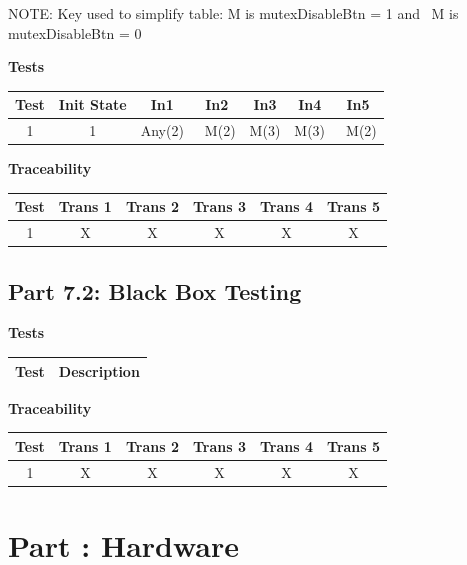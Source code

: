 \documentclass{article}
\newcounter{partNum}
\newcommand{\partNum}{%
        \stepcounter{partNum}%
        \thepartNum}
\newcommand{\sectPart}[1]{\section*{Part \partNum: #1}}
\begin{document}
NOTE: Key used to simplify table: M is mutexDisableBtn = 1 and ~M is mutexDisableBtn = 0

\vspace*{2em}

\textbf{Tests}\\
\begin{tabular}{c | c | c | c | c | c | c}
Test & Init State & In1 & In2 & In3 & In4 & In5 \\ \hline
1 & 1 & Any(2) & ~M(2) & M(3) & M(3) & ~M(2) \\
\end{tabular}

\vspace*{2em}

\textbf{Traceability} \\
\begin{tabular}{c | c | c | c | c | c}
Test & Trans 1 & Trans 2 & Trans 3 & Trans 4 & Trans 5 \\ \hline
1 & X & X & X & X & X \\
\end{tabular}

\subsection*{Part 7.2: Black Box Testing}

\textbf{Tests}\\
\begin{tabular}{c | c{30em} }
Test & Description \\ \hline
\end{tabular}

\vspace*{2em}

\textbf{Traceability} \\
\begin{tabular}{c | c | c | c | c | c}
Test & Trans 1 & Trans 2 & Trans 3 & Trans 4 & Trans 5 \\ \hline
1 & X & X & X & X & X \\
\end{tabular}


\sectPart{Hardware}
\end{document}
